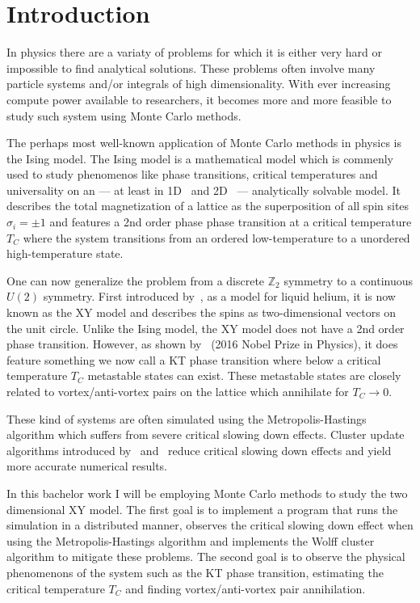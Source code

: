 \chapter{Introduction}\label{chap:introduction}
	In physics there are a variaty of problems for which it is either very hard or impossible to find analytical solutions. These problems often involve many particle systems and/or integrals of high dimensionality. With ever increasing compute power available to researchers, it becomes more and more feasible to study such system using Monte Carlo methods.
	
	The perhaps most well-known application of Monte Carlo methods in physics is the Ising model. The Ising model is a mathematical model which is commenly used to study phenomenos like phase transitions, critical temperatures and universality on an --- at least in 1D~\cite{ising} and 2D~\cite{onsager} --- analytically solvable model. It describes the total magnetization of a lattice as the superposition of all spin sites $\sigma_i = \pm 1$ and features a 2nd order phase phase transition at a critical temperature $T_C$ where the system transitions from an ordered low-temperature to a unordered high-temperature state.
	
	One can now generalize the problem from a discrete $\mathbb{Z}_2$ symmetry to a continuous $U(2)$ symmetry. First introduced by~\cite{matsubara}, as a model for liquid helium, it is now known as the XY model and describes the spins as two-dimensional vectors on the unit circle. Unlike the Ising model, the XY model does not have a 2nd order phase transition. However, as shown by~\cite{kosterlitz} (2016 Nobel Prize in Physics), it does feature something we now call a KT phase transition where below a critical temperature $T_C$ metastable states can exist. These metastable states are closely related to vortex/anti-vortex pairs on the lattice which annihilate for $T_C \rightarrow 0$.
	
	These kind of systems are often simulated using the Metropolis-Hastings algorithm which suffers from severe critical slowing down effects. Cluster update algorithms introduced by~\cite{sw} and~\cite{wolff} reduce critical slowing down effects and yield more accurate numerical results.
	
	In this bachelor work I will be employing Monte Carlo methods to study the two dimensional XY model. The first goal is to implement a program that runs the simulation in a distributed manner, observes the critical slowing down effect when using the Metropolis-Hastings algorithm and implements the Wolff cluster algorithm to mitigate these problems. The second goal is to observe the physical phenomenons of the system such as the KT phase transition, estimating the critical temperature $T_C$ and finding vortex/anti-vortex pair annihilation.
	